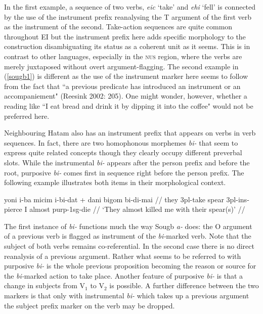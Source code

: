 In the first example, a sequence of two verbs, \textit{eic} `take' and \textit{ehi} `fell' is connected by the use of the instrument prefix reanalysing the T argument of the first verb as the instrument of the second. Take-action sequences are quite common throughout EI but the instrument prefix here adds specific morphology to the construction disambiguating its status as a coherent unit as it seems. This is in contrast to other languages, especially in the \textsc{nus} region, where the verbs are merely juxtaposed without overt argument-flagging. The second example in (\ref{sougb1}) is different as the use of the instrument marker here seems to follow from the fact that ``a previous predicate has introduced an instrument or an accompaniement" (Reesink 2002: 205). One might wonder, however, whether a reading like ``I eat bread and drink it by dipping it into the coffee" would not be preferred here.

Neighbouring Hatam also has an instrument prefix that appears on verbs in verb sequences. In fact, there are two homophonous morphemes \textit{bi-} that seem to express quite related concepts though they clearly occupy different preverbal slots. While the instrumental \textit{bi-} appears after the person prefix and before the root, purposive \textit{bi-} comes first in sequence right before the person prefix. The following example illustrates both items in their morphological context.

\ex \label{}
\begingl[glhangstyle=none]
\gla yoni i-ba micim i-bi-dat + dani bigom bi-di-mai // 
\glb they \acs{3}\acs{pl}-take spear \acs{3}\acs{pl}-\acs{ins}-pierce I almost \acs{purp}-\acs{1}\acs{sg}-die //
\glft `They almost killed me with their spear(s)' // 
\endgl
\xe

The first instance of \textit{bi-} functions much the way Sougb \textit{a-} does: the O argument of a previous verb is flagged as instrument of the \textit{bi-}marked verb. Note that the subject of both verbs remains co-referential. In the second case there is no direct reanalysis of a previous argument. Rather what seems to be referred to with purposive \textit{bi-} is the whole previous proposition becoming the reason or source for the \textit{bi-}marked action to take place. Another feature of purposive \textit{bi-} is that a change in subjects from V$_1$ to V$_2$ is possible. A further difference between the two markers is that only with instrumental \textit{bi-} which takes up a previous argument the subject prefix marker on the verb may be dropped.


